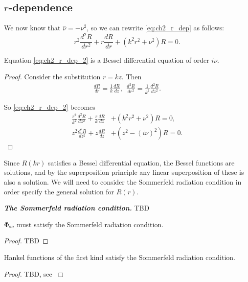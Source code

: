 \subsection{\texorpdfstring{$r$}{r}-dependence} 
We now know that $\hat{\nu} = - \nu^2$, so we can rewrite \eqref{eq:ch2_r_dep} as follows:
    \begin{equation}\label{eq:ch2_r_dep_2}
        r^2 \frac{d^2 R}{dr^2} + r \frac{d R}{dr} + (k^2r^2 + \nu^2) R = 0.
    \end{equation}
    \begin{propn}
    Equation \eqref{eq:ch2_r_dep_2} is a Bessel differential equation of order $i\nu$.
    \end{propn}
    \begin{proof} Consider the substitution $r=kz$. Then
        \begin{align*}
            \frac{dR}{dr} = \frac{1}{k} \frac{dR}{dz}, ~~ 
            \frac{d^2R}{dr^2} = \frac{1}{k^2} \frac{d^2R}{dz^2}.
        \end{align*}\par
    So \eqref{eq:ch2_r_dep_2} becomes
        \begin{align}
            \frac{r^2}{k^2}\frac{d^2R}{dz^2}
                + \frac{r}{k}\frac{dR}{dz} 
                &+ (k^2r^2 + \nu^2)R = 0, \\
            z^2 \frac{d^2 R}{dz^2}
                + z \frac{dR}{dz}
                &+ (z^2 - (i\nu)^2)R = 0.
        \end{align}
    \end{proof}\par
%
Since $R(kr)$ satisfies a Bessel differential equation, the Bessel functions are solutions, and by the superposition principle any linear superposition of these is also a solution. We will need to consider the Sommerfeld radiation condition in order specify the general solution for $R(r)$. \par
%
    \begin{defn}\textbf{\emph{The Sommerfeld radiation condition.}} TBD
    \end{defn}
%
    \begin{propn}
        $\Phi_{\text{sc}}$ must satisfy the Sommerfeld radiation condition.
    \end{propn}
    \begin{proof} TBD
    \end{proof}
%
    \begin{propn}
        Hankel functions of the first kind satisfy the Sommerfeld radiation condition.
    \end{propn}
    \begin{proof}
        TBD, see \cite[$\S$4.2]{martin06scattering}
    \end{proof}
%
